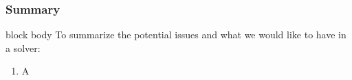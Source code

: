 \documentclass[aspectratio=169,xcolor=dvipsnames,11pt]{beamer}
\begin{document}
 \begin{frame}\frametitle{Summary}
      \begin{beamercolorbox}[rounded=true, shadow=true, wd=\textwidth]{block body}
To summarize the potential issues and what we would like to have in a solver:
\begin{enumerate}
\item A
\end{enumerate}
   \end{beamercolorbox}
 \end{frame}

    
    
    
    
    
    
    
    
    
    
    
    
\end{document}
